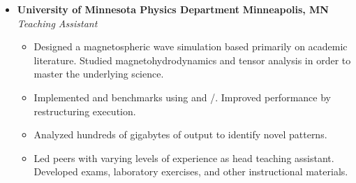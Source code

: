 \begin{itemize}[leftmargin=\parindent]
\begin{itemize}
        \end{itemize}

    \item[]
        \headerrow
        {\textbf{University of Minnesota Physics Department}}
        {\textbf{Minneapolis, MN}}
        \\
        \headerrow
        {\emph{Teaching Assistant}}
        {\emph{}}
        \begin{itemize}
            \item Designed a magnetospheric wave simulation based primarily on academic literature. Studied magnetohydrodynamics and tensor analysis in order to master the underlying science. 
            \item Implemented \CPP and \Fortran benchmarks using \OpenMP and \MPI/\OpenMP. Improved performance by restructuring execution. 
            \item Analyzed hundreds of gigabytes of output to identify novel patterns. 
            \item Led peers with varying levels of experience as head teaching assistant. Developed exams, laboratory exercises, and other instructional materials. 
        \end{itemize}




% 






\end{itemize}










